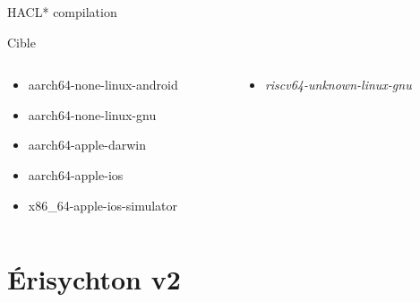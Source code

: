 \documentclass[A4,svgnames,9pt,aspectratio=169]{beamer}
\begin{document}
\begin{frame}{HACL* compilation}

  \begin{block}{Cible}
    \begin{columns}
      \begin{column}{0.5\textwidth}
        \begin{itemize}
          \item aarch64-none-linux-android
          \item aarch64-none-linux-gnu
          \item aarch64-apple-darwin
          \item aarch64-apple-ios
          \item x86\_64-apple-ios-simulator
        \end{itemize}
    \end{column}
    \begin{column}{0.5\textwidth}
      \begin{itemize}
        \item \textit{riscv64-unknown-linux-gnu}
      \end{itemize}
    \end{column}
  \end{columns}
  \end{block}

\end{frame}



\section{Érisychton v2}
\frame{\sectionpage}
\end{document}
